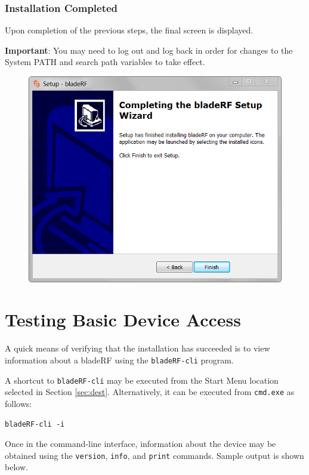 {\newpage
\subsubsection{Installation Completed}

Upon completion of the previous steps, the final screen is displayed.

\textbf{Important}: You may need to log out and log back in order for
changes to the System PATH and \matlab search path variables to take effect.

\begin{figure}[h]
  \centering
  \includegraphics{images/windows/installer/11-complete.png}
\end{figure}

\newpage
\section{Testing Basic Device Access}

A quick means of verifying that the installation has succeeded is to
view information about a bladeRF using the \texttt{bladeRF-cli} program.

A shortcut to \texttt{bladeRF-cli} may be executed from the Start Menu
location selected in Section \ref{sec:dest}.  Alternatively, it can
be executed from \texttt{cmd.exe} as follows:

\centerline{\texttt{bladeRF-cli -i}}

Once in the command-line interface, information about the
device may be obtained using the \texttt{version}, \texttt{info},
and \texttt{print} commands. Sample output is shown below.

}

